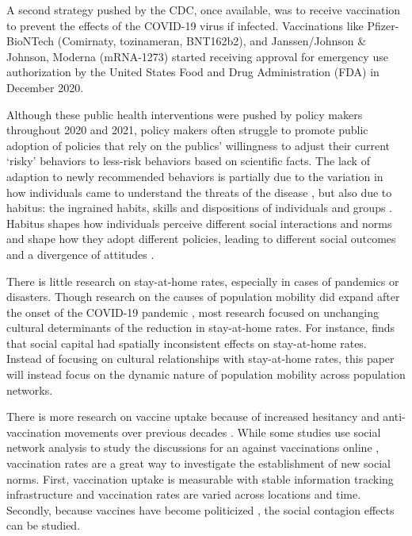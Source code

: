 A second strategy pushed by the CDC, once available, was to receive vaccination
to prevent the effects of the COVID-19 virus if infected. Vaccinations like
Pfizer-BioNTech (Comirnaty, tozinameran, BNT162b2), and Janssen/Johnson \&
Johnson, Moderna (mRNA-1273) started receiving approval for emergency use
authorization by the United States Food and Drug Administration (FDA) in
December 2020.

Although these public health interventions were pushed by policy makers
throughout 2020 and 2021, policy makers often struggle to promote public
adoption of policies that rely on the publics' willingness to adjust their
current `risky' behaviors to less-risk behaviors based on scientific facts. The
lack of adaption to newly recommended behaviors is partially due to the
variation in how individuals came to understand the threats of the disease
\citep{akpanAssociationWhatPeople2021, bailey_etal20}, but also due to habitus:
the ingrained habits, skills and dispositions of individuals and groups
\citep{bourdieu77}. Habitus shapes how individuals perceive different social
interactions and norms and shape how they adopt different policies, leading to
different social outcomes and a divergence of attitudes
\citep{scottarthur_etal21, williams95, madeira_etal18}.

There is little research on stay-at-home rates, especially in cases of pandemics
or disasters. Though research on the causes of population mobility did expand
after the onset of the COVID-19 pandemic
\citep{bargainTrustCompliancePublic2020, bourassaStatelevelStayathomeOrders2020,
bourassaSocialDistancingHealth2020, grossmanPoliticalPartisanshipInfluences2020,
haggerPredictingSocialDistancing2020, hillBloodChristCompels2020,
hillNastiestQuestion, hillLoveThyAged2021,huynhDoesCultureMatter2020}, most
research focused on unchanging cultural determinants of the reduction in
stay-at-home rates. For instance, \citet{gibbons_etal21} finds that social
capital had spatially inconsistent effects on stay-at-home rates. Instead of
focusing on cultural relationships with stay-at-home rates, this paper will
instead focus on the dynamic nature of population mobility across population
networks.

There is more research on vaccine uptake
\citep{schmidBarriersInfluenzaVaccination2017} because of increased hesitancy
and anti-vaccination movements over previous decades
\citep{baumgaertnerInfluencePoliticalIdeology2018,
hornseyDonaldTrumpVaccination2020, johnsonOnlineCompetitionPro2020,
whiteheadHowCultureWars2020}. While some studies use social network analysis to
study the discussions for an against vaccinations online
\citep{milaniVisualVaccineDebate2020}, vaccination rates are a great way to
investigate the establishment of new social norms. First, vaccination uptake is
measurable with stable information tracking infrastructure and vaccination rates
are varied across locations and time. Secondly, because vaccines have become
politicized \citep{mottaRepublicansNotDemocrats2021,
mottaIdentifyingPrevalenceCorrelates2021}, the social contagion effects can be
studied.

